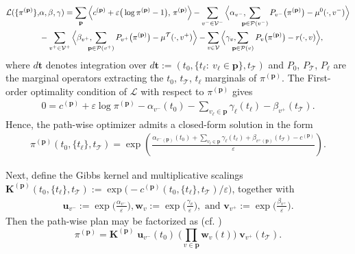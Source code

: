 \documentclass[11pt]{article}
\newcommand{\calV}{{\mathcal V}}
\newcommand{\calT}{{\mathcal T}}
\newcommand{\calP}{{\mathcal P}}
\newcommand{\bK}{{\mathbf K}}
\newcommand{\bp}{{\mathbf p}}
\newcommand{\bu}{{\mathbf u}}
\newcommand{\bv}{{\mathbf v}}
\newcommand{\bw}{{\mathbf w}}
\begin{document}
\begin{align*}
\mathcal L(\{\pi^{(\bp)}\},&\alpha,\beta,\gamma)
=
\sum_{\bp}
\Big\langle c^{(\bp)} + \varepsilon\big(\log \pi^{(\bp)} - 1\big),\,\pi^{(\bp)} \Big\rangle 
\hspace{-0.4pt}-\sum_{v^-\in \calV^{-}} \Big\langle \alpha_{v^-},\!\!\!\!
\sum_{\bp\in\calP(v^-)} P_{v^-}\big(\pi^{(\bp)}\big) - \mu^0(\cdot,v^-) \Big\rangle \nonumber\\
&
-\sum_{v^+\in \calV^+} \Big\langle \beta_{v^+},\!\!\!\!
\sum_{\bp\in\calP(v^+)} P_{v^+}\big(\pi^{(\bp)}\big) - \mu^{\calT}(\cdot,v^+) \Big\rangle 
-\sum_{v\in \calV} \Big\langle \gamma_v,\!\!\!\!
\sum_{\bp\in\calP(v)} P_{v}\big(\pi^{(\bp)}\big) - r(\cdot,v) \Big\rangle ,
\end{align*}
where $d\mathbf t$ denotes integration over $d\mathbf t:=(t_0,\{t_\ell:\ v_\ell\in\bp\},t_{\calT})$ and $P_0$, $P_{\calT}$, $P_\ell$ are the marginal operators extracting the $t_0$, $t_{\calT}$, $t_\ell$ marginals of $\pi^{(\bp)}$. The First-order optimality condition of $\mathcal L$ with respect to $\pi^{(\bp)}$ gives
\begin{align*}
0
= c^{(\bp)}+\varepsilon \log \pi^{(\bp)}
\!-\!\alpha_{v^-}(t_0)
\!-\!\!\sum_{v_\ell\in\bp}\gamma_\ell(t_\ell)
\!-\!\beta_{v^+}(t_{\calT}) .
\end{align*}
Hence, the path-wise optimizer admits a closed-form solution in the form
\begin{align*}
\pi^{(\bp)}(t_0,\{t_\ell\},t_{\calT}) =\exp\!\left(
\frac{\alpha_{v^-(\bp)}(t_0)
+\sum_{v_\ell\in\bp}\gamma_\ell(t_\ell)
+\beta_{v^+(\bp)}(t_{\calT})
- c^{(\bp)}}{\varepsilon}
\right).
\end{align*}

Next, define the Gibbs kernel and multiplicative scalings
$\bK^{(\bp)}(t_0,\{t_\ell\},t_{\calT}):=\exp\!\big(-c^{(\bp)}(t_0,\{t_\ell\},t_{\calT})/\varepsilon\big)$, together with
\begin{align*}
\bu_{v^-}\!\!:=\exp\!\big(\frac{\alpha_{v^-}}{\varepsilon}\big),  \bw_v:=\exp\!\big(\frac{\gamma_v}{\varepsilon}\big), \mbox{ and } \bv_{v^+}:=\exp\!\big(\frac{\beta_{v^+}}{\varepsilon}\big).
\end{align*}
Then the path-wise plan may be factorized as (cf.
\cite{elvander2020multi})
\begin{equation}\label{eq:closed-form}
\pi^{(\bp)}=\bK^{(\bp)}\;\bu_{v^-}(t_0)\;\Big(\prod_{v\in\bp} \bw_{v}(t)\Big)\;\bv_{v^+}(t_{\calT}).
\end{equation}
\end{document}
